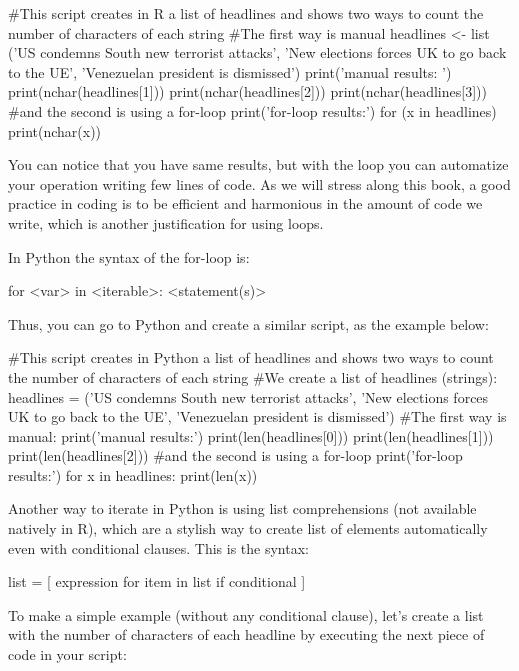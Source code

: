 \begin{exampler}
#This script creates in R a list of headlines and shows two ways to count the number of characters of each string
#The first way is manual 
headlines <- list ('US condemns South new terrorist  attacks', 'New elections forces UK to go back to the UE', 'Venezuelan president is dismissed') 
print('manual results:	')
print(nchar(headlines[1]))
print(nchar(headlines[2]))
print(nchar(headlines[3]))
#and the second is using a for-loop
print('for-loop results:')
for (x in headlines){
  print(nchar(x))
}
\end{exampler}

You can notice that you have same results, but with the loop you can automatize your operation writing few lines of code. As we will stress along this book, a good practice in coding is to be efficient and harmonious in the amount of code we write, which is another justification for using loops.  

In Python the syntax of the for-loop is:

\begin{examplepy}
for <var> in <iterable>:
    <statement(s)>
\end{examplepy}

Thus, you can go to Python and create a similar script, as the example below:

\begin{examplepy}
#This script creates in Python a list of headlines and shows two ways to count the number of characters of each string
#We create a list of headlines (strings):
headlines = ('US condemns South new terrorist  attacks', 'New elections forces UK to go back to the UE', 'Venezuelan president is dismissed') 
#The first way is manual:
print('manual results:')
print(len(headlines[0]))
print(len(headlines[1]))
print(len(headlines[2]))
#and the second is using a for-loop
print('for-loop results:')
for x in headlines:
    print(len(x))
\end{examplepy}

Another way to iterate in Python is using list comprehensions  (not available natively in R), which are a stylish way to create list of elements automatically even with conditional clauses. This is the syntax:

\begin{examplepy}
list  = [ expression for item in list if conditional ]
\end{examplepy}

To make a simple example (without any conditional clause), let's create a list with the number of characters of each headline by executing the next piece of code in your script:

